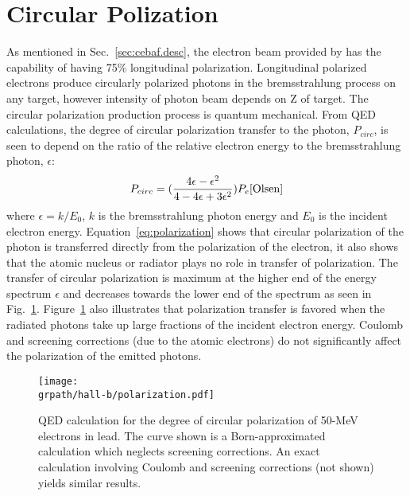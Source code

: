 \FloatBarrier
\section{Circular Polization} \label{sec:clas.polar}

As mentioned in Sec.~\ref{sec:cebaf.desc}, the electron beam provided by  has the capability of having 75\% longitudinal polarization. Longitudinal polarized electrons produce circularly polarized photons in the bremsstrahlung process on any target, however intensity of photon beam depends on Z of target. The circular polarization production process is quantum mechanical. From QED calculations, the degree of circular polarization transfer to the photon, $P_{circ}$, is seen to depend on the ratio of the relative electron energy to the bremsstrahlung photon, $\epsilon$:
\begin{equation}\label{eq:polarization}
	P_{circ} = (\frac{4\epsilon - \epsilon^{2}}{4-4\epsilon+3\epsilon^{2}})P_{e} \cite{Olsen}
\end{equation}
where $\epsilon = k/E_{0}$, $k$ is the bremsstrahlung photon energy and $E_{0}$ is the incident electron energy. Equation~\ref{eq:polarization} shows that circular polarization of the photon is transferred directly from the polarization of the electron, it also shows that the atomic nucleus or radiator plays no role in transfer of polarization. The transfer of circular polarization is maximum at the higher end of the energy spectrum $\epsilon$ and decreases towards the lower end of the spectrum as seen in Fig.~\ref{fig:jlab.polarization}. Figure~\ref{fig:jlab.polarization} also illustrates that polarization transfer is favored when the radiated photons take up large fractions of the incident electron energy. Coulomb and screening corrections (due to the atomic electrons) do not significantly affect the polarization of the emitted photons. 

\begin{figure}[h!]\begin{center}
\texttt{[image: \\grpath/hall-b/polarization.pdf]}
\caption[Circular polarization Graph]{\label{fig:jlab.polarization}QED calculation for the degree of circular polarization of 50-MeV electrons in lead. The curve shown is a Born-approximated calculation which neglects screening corrections. An exact calculation involving Coulomb and screening corrections (not shown) yields similar results.\cite{Olsen}}
\end{center}\end{figure}
